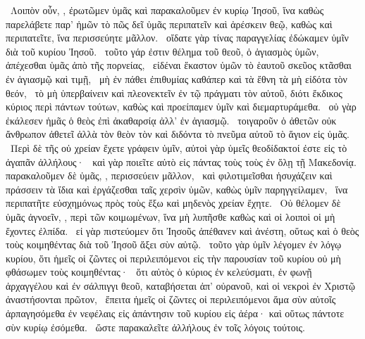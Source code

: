 ~Λοιπὸν οὖν, , ἐρωτῶμεν ὑμᾶς καὶ παρακαλοῦμεν ἐν κυρίῳ Ἰησοῦ, ἵνα καθὼς παρελάβετε παρ’ ἡμῶν τὸ πῶς δεῖ ὑμᾶς περιπατεῖν καὶ ἀρέσκειν θεῷ, καθὼς καὶ περιπατεῖτε, ἵνα περισσεύητε μᾶλλον.
~οἴδατε γὰρ τίνας παραγγελίας ἐδώκαμεν ὑμῖν διὰ τοῦ κυρίου Ἰησοῦ.
~τοῦτο γάρ ἐστιν θέλημα τοῦ θεοῦ, ὁ ἁγιασμὸς ὑμῶν, ἀπέχεσθαι ὑμᾶς ἀπὸ τῆς πορνείας,
~εἰδέναι ἕκαστον ὑμῶν τὸ ἑαυτοῦ σκεῦος κτᾶσθαι ἐν ἁγιασμῷ καὶ τιμῇ,
~μὴ ἐν πάθει ἐπιθυμίας καθάπερ καὶ τὰ ἔθνη τὰ μὴ εἰδότα τὸν θεόν,
~τὸ μὴ ὑπερβαίνειν καὶ πλεονεκτεῖν ἐν τῷ πράγματι τὸν  αὐτοῦ, διότι ἔκδικος κύριος περὶ πάντων τούτων, καθὼς καὶ προείπαμεν ὑμῖν καὶ διεμαρτυράμεθα.
~οὐ γὰρ ἐκάλεσεν ἡμᾶς ὁ θεὸς ἐπὶ ἀκαθαρσίᾳ ἀλλ’ ἐν ἁγιασμῷ.
~τοιγαροῦν ὁ ἀθετῶν οὐκ ἄνθρωπον ἀθετεῖ ἀλλὰ τὸν θεὸν τὸν καὶ διδόντα τὸ πνεῦμα αὐτοῦ τὸ ἅγιον εἰς ὑμᾶς.
~Περὶ δὲ τῆς  οὐ χρείαν ἔχετε γράφειν ὑμῖν, αὐτοὶ γὰρ ὑμεῖς θεοδίδακτοί ἐστε εἰς τὸ ἀγαπᾶν ἀλλήλους·
~καὶ γὰρ ποιεῖτε αὐτὸ εἰς πάντας τοὺς  τοὺς ἐν ὅλῃ τῇ Μακεδονίᾳ. παρακαλοῦμεν δὲ ὑμᾶς, , περισσεύειν μᾶλλον,
~καὶ φιλοτιμεῖσθαι ἡσυχάζειν καὶ πράσσειν τὰ ἴδια καὶ ἐργάζεσθαι ταῖς χερσὶν ὑμῶν, καθὼς ὑμῖν παρηγγείλαμεν,
~ἵνα περιπατῆτε εὐσχημόνως πρὸς τοὺς ἔξω καὶ μηδενὸς χρείαν ἔχητε.
~Οὐ θέλομεν δὲ ὑμᾶς ἀγνοεῖν, , περὶ τῶν κοιμωμένων, ἵνα μὴ λυπῆσθε καθὼς καὶ οἱ λοιποὶ οἱ μὴ ἔχοντες ἐλπίδα.
~εἰ γὰρ πιστεύομεν ὅτι Ἰησοῦς ἀπέθανεν καὶ ἀνέστη, οὕτως καὶ ὁ θεὸς τοὺς κοιμηθέντας διὰ τοῦ Ἰησοῦ ἄξει σὺν αὐτῷ.
~τοῦτο γὰρ ὑμῖν λέγομεν ἐν λόγῳ κυρίου, ὅτι ἡμεῖς οἱ ζῶντες οἱ περιλειπόμενοι εἰς τὴν παρουσίαν τοῦ κυρίου οὐ μὴ φθάσωμεν τοὺς κοιμηθέντας·
~ὅτι αὐτὸς ὁ κύριος ἐν κελεύσματι, ἐν φωνῇ ἀρχαγγέλου καὶ ἐν σάλπιγγι θεοῦ, καταβήσεται ἀπ’ οὐρανοῦ, καὶ οἱ νεκροὶ ἐν Χριστῷ ἀναστήσονται πρῶτον,
~ἔπειτα ἡμεῖς οἱ ζῶντες οἱ περιλειπόμενοι ἅμα σὺν αὐτοῖς ἁρπαγησόμεθα ἐν νεφέλαις εἰς ἀπάντησιν τοῦ κυρίου εἰς ἀέρα· καὶ οὕτως πάντοτε σὺν κυρίῳ ἐσόμεθα.
~ὥστε παρακαλεῖτε ἀλλήλους ἐν τοῖς λόγοις τούτοις.

